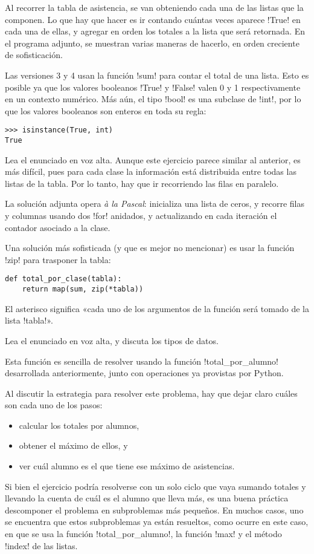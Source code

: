 \documentclass[10pt]{article}
\begin{document}
  Al recorrer la tabla de asistencia,
  se van obteniendo cada una de las listas que la componen.
  Lo que hay que hacer es ir contando cuántas veces aparece \li!True!
  en cada una de ellas, y agregar en orden los totales a la lista que será retornada.
  En el programa adjunto,
  se muestran varias maneras de hacerlo,
  en orden creciente de sofisticación.

  Las versiones 3 y 4 usan la función \li!sum! para contar el total de una lista.
  Esto es posible ya que los valores booleanos \li!True! y \li!False!
  valen 0 y 1 respectivamente en un contexto numérico.
  Más aún, el tipo \li!bool! es una subclase de \li!int!,
  por lo que los valores booleanos son enteros en toda su regla:
  \begin{lstlisting}
>>> isinstance(True, int)
True
  \end{lstlisting}


  Lea el enunciado en voz alta.
  Aunque este ejercicio parece similar al anterior,
  es más difícil, pues para cada clase la información está distribuida
  entre todas las listas de la tabla.
  Por lo tanto, hay que ir recorriendo las filas en paralelo.

  La solución adjunta opera \emph{à la Pascal}:
  inicializa una lista de ceros, y recorre filas y columnas
  usando dos \li!for! anidados, y actualizando en cada iteración
  el contador asociado a la clase.

  Una solución más sofisticada (y que es mejor no mencionar)
  es usar la función \li!zip! para trasponer la tabla:
  \begin{lstlisting}
def total_por_clase(tabla):
    return map(sum, zip(*tabla))
  \end{lstlisting}
  El asterisco significa «cada uno de los argumentos de la función
  será tomado de la lista \li!tabla!».


  Lea el enunciado en voz alta, y discuta los tipos de datos.

  Esta función es sencilla de resolver usando la función \li!total_por_alumno!
  desarrollada anteriormente, junto con operaciones ya provistas por Python.

  Al discutir la estrategia para resolver este problema,
  hay que dejar claro cuáles son cada uno de los pasos:
  \begin{itemize}
    \item calcular los totales por alumnos,
    \item obtener el máximo de ellos, y
    \item ver cuál alumno es el que tiene ese máximo de asistencias.
  \end{itemize}
  Si bien el ejercicio podría resolverse con un solo ciclo que vaya sumando
  totales y llevando la cuenta de cuál es el alumno que lleva más,
  es una buena práctica descomponer el problema en subproblemas más pequeños.
  En muchos casos, uno se encuentra que estos subproblemas ya están resueltos,
  como ocurre en este caso, en que se usa la función \li!total_por_alumno!,
  la función \li!max! y el método \li!index! de las listas.
\end{document}

